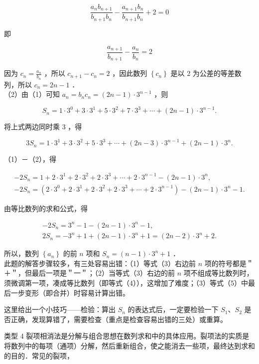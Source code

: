 \documentclass[10pt]{article}
\begin{document}
\[
\frac{a_{n} b_{n+1}}{b_{n+1} b_{n}}-\frac{a_{n+1} b_{n}}{b_{n+1} b_{n}}+2=0
\]

即

\[
\frac{a_{n+1}}{b_{n+1}}-\frac{a_{n}}{b_{n}}=2
\]

因为 \(c_{n}=\frac{a_{n}}{b_{n}}\) ，所以 \(c_{n+1}-c_{n}=2\) ，因此数列 \(\left\{c_{n}\right\}\) 是以 2 为公差的等差数列，所以 \(c_{n}=2 n-1\) ．\\
（2）由（1）可知 \(a_{n}=b_{n} c_{n}=(2 n-1) \cdot 3^{n-1}\) ，则

\[
S_{n}=1 \cdot 3^{0}+3 \cdot 3^{1}+5 \cdot 3^{2}+7 \cdot 3^{3}+\cdots+(2 n-1) \cdot 3^{n-1} .
\]

将上式两边同时乘 3 ，得

\[
3 S_{n}=1 \cdot 3^{1}+3 \cdot 3^{2}+5 \cdot 3^{3}+\cdots+(2 n-3) \cdot 3^{n-1}+(2 n-1) \cdot 3^{n} .
\]

（1）－（2），得

\[
\begin{gathered}
-2 S_{n}=1+2 \cdot 3^{1}+2 \cdot 3^{2}+2 \cdot 3^{3}+\cdots+2 \cdot 3^{n-1}-(2 n-1) \cdot 3^{n}, \\
-2 S_{n}=\left(2 \cdot 3^{0}+2 \cdot 3^{1}+2 \cdot 3^{2}+2 \cdot 3^{3}+\cdots+2 \cdot 3^{n-1}\right)-(2 n-1) \cdot 3^{n}-1 .
\end{gathered}
\]

由等比数列的求和公式，得

\[
\begin{gathered}
-2 S_{n}=3^{n}-1-(2 n-1) \cdot 3^{n}-1, \\
2 S_{n}=-3^{n}+1+(2 n-1) \cdot 3^{n}+1=(2 n-2) \cdot 3^{n}+2 .
\end{gathered}
\]

所以，数列 \(\left\{a_{n}\right\}\) 的前 \(n\) 项和 \(S_{n}=(n-1) \cdot 3^{n}+1\) ．\\
此题的解答步骤较多，有三处容易出错：（1）等式（3）右边前 \(n\) 项的符号都是＂＋＂，但最后一项是＂一＂；（2）当等式（3）右边的前 \(n\) 项不组成等比数列时，须微调第一项，凑成等比数列（即等式（4）），这增加了难度；（3）等式（5）中最后一步变形（即合并）时容易计算出错。

这里给出一个小技巧——检验：算出 \(S_{n}\) 的表达式后，一定要检验一下 \(S_{1} 、 S_{2}\) 是否正确，发现算错了，需要检查（重点是检查容易出错的三处）或重算。

类型 4 裂项相消法是分解与组合思想在数列求和中的具体应用。裂项法的实质是将数列中的每项（通项）分解，然后重新组合，使之能消去一些项，最终达到求和的目的．常见的裂项，
\end{document}

